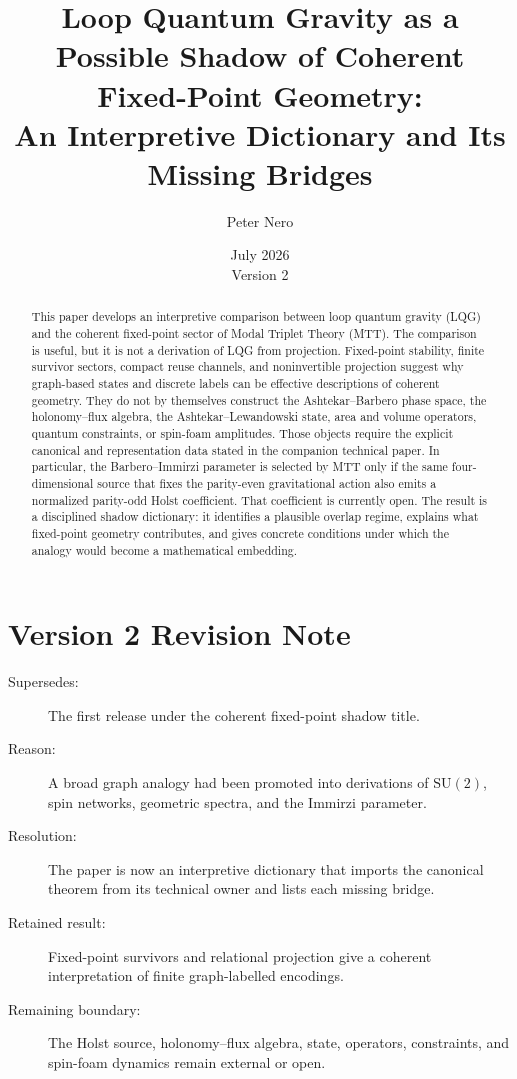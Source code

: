 \documentclass[11pt]{article}
\title{Loop Quantum Gravity as a Possible Shadow of Coherent Fixed-Point Geometry:\\
\large An Interpretive Dictionary and Its Missing Bridges}
\author{Peter Nero}
\date{July 2026\\Version 2}
\begin{document}
\maketitle

\begin{abstract}
This paper develops an interpretive comparison between loop quantum gravity
(LQG) and the coherent fixed-point sector of Modal Triplet Theory (MTT). The
comparison is useful, but it is not a derivation of LQG from projection.
Fixed-point stability, finite survivor sectors, compact reuse channels, and
noninvertible projection suggest why graph-based states and discrete labels
can be effective descriptions of coherent geometry. They do not by
themselves construct the Ashtekar--Barbero phase space, the holonomy--flux
algebra, the Ashtekar--Lewandowski state, area and volume operators, quantum
constraints, or spin-foam amplitudes. Those objects require the explicit
canonical and representation data stated in the companion technical paper.
In particular, the Barbero--Immirzi parameter is selected by MTT only if the
same four-dimensional source that fixes the parity-even gravitational action
also emits a normalized parity-odd Holst coefficient. That coefficient is
currently open. The result is a disciplined shadow dictionary: it identifies
a plausible overlap regime, explains what fixed-point geometry contributes,
and gives concrete conditions under which the analogy would become a
mathematical embedding.
\end{abstract}

\section*{Version 2 Revision Note}
\begin{description}
\item[Supersedes:] The first release under the coherent fixed-point shadow
title.
\item[Reason:] A broad graph analogy had been promoted into derivations of
\(\mathrm{SU}(2)\), spin networks, geometric spectra, and the Immirzi
parameter.
\item[Resolution:] The paper is now an interpretive dictionary that imports
the canonical theorem from its technical owner and lists each missing bridge.
\item[Retained result:] Fixed-point survivors and relational projection give
a coherent interpretation of finite graph-labelled encodings.
\item[Remaining boundary:] The Holst source, holonomy--flux algebra, state,
operators, constraints, and spin-foam dynamics remain external or open.
\end{description}
\end{document}
